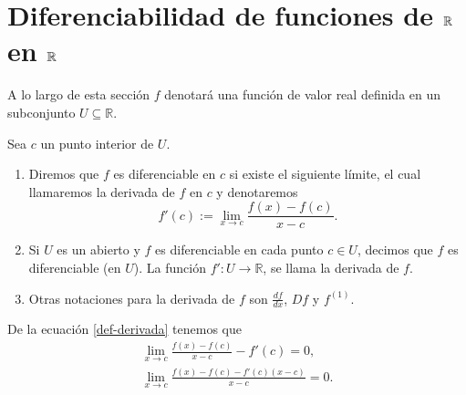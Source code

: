 \section{Diferenciabilidad de funciones de \texorpdfstring{$\mathbb{R}$}{R} en \texorpdfstring{$\mathbb{R}$}{R}}
A lo largo de esta sección $f$ denotará una función de valor real definida en un subconjunto  $U\subseteq \mathbb{R}.$
\begin{definicion}
 Sea $c$ un punto interior de $U$. 
 \begin{enumerate}
     \item Diremos que $f$ es diferenciable en $c$ si existe el siguiente límite, el cual llamaremos la derivada de $f$ en $c$ y denotaremos
 \begin{equation}\label{def-derivada}
 f'(c):=\lim_{x\to c}\frac{f(x)-f(c)}{x-c}.    
 \end{equation}
 
 \item Si $U$ es un abierto y $f$ es diferenciable en cada punto $c\in U$, decimos que $f$ es diferenciable (en $U$). La función $f':U\to \mathbb{R}$, se llama la  derivada de $f$.
 \item Otras notaciones para la derivada de $f$  son $\frac{df}{dx}$, $Df$ y $f^{(1)}$.
 \end{enumerate}
\end{definicion}

\begin{remark}
De la ecuación \eqref{def-derivada} tenemos que 
\begin{gather*}
\lim_{x\to c}\frac{f(x)-f(c)}{x-c}-f'(c)=0,\\
\lim_{x\to c}\frac{f(x)-f(c)-f'(c)(x-c)}{x-c}=0.
\end{gather*}
\end{remark}

